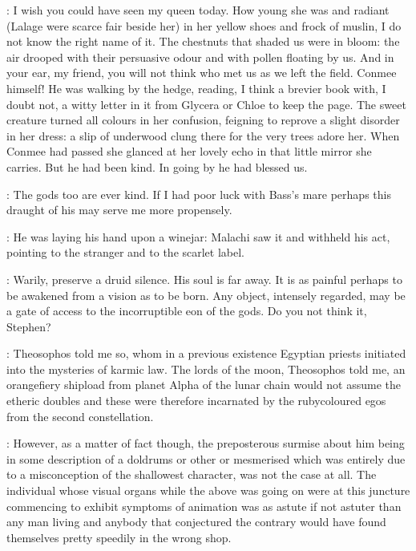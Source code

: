 \documentclass[12pt]{article}
\begin{document}
\Ly: I wish you could have seen my queen today.
How young she was and radiant (Lalage were scarce fair beside her)
in her yellow shoes and frock of muslin, I do not know the right name of
it. The chestnuts that shaded us were in bloom: the air drooped with
their persuasive odour and with pollen floating by us.
And in your ear, my friend,
you will not think who met us as we left the field.
Conmee himself! He was walking by the hedge, reading, I think a brevier
book with, I doubt not, a witty letter in it from Glycera or Chloe to
keep the page. The sweet creature turned all colours in her confusion,
feigning to reprove a slight disorder in her dress: a slip of underwood
clung there for the very trees adore her. When Conmee had passed she
glanced at her lovely echo in that little mirror she carries. But he had
been kind. In going by he had blessed us.

\Ln: The gods too are ever kind.
If I had poor luck with Bass's mare perhaps this draught of
his may serve me more propensely.

: He was laying his hand upon a winejar:
Malachi saw it and withheld his act, pointing to the stranger and to the
scarlet label.

\Mu:  Warily, preserve a druid silence.
His soul is far away. It is as painful perhaps to be awakened from a vision
as to be born. Any object, intensely regarded, may be a gate of access to
the incorruptible eon of the gods. Do you not think it, Stephen?

\SD: Theosophos told me so, whom in a previous existence
Egyptian priests initiated into the mysteries of karmic law. The lords of
the moon, Theosophos told me, an orangefiery shipload from planet Alpha
of the lunar chain would not assume the etheric doubles and these were
therefore incarnated by the rubycoloured egos from the second
constellation.



: However, as a matter of fact though, the preposterous surmise about him
being in some description of a doldrums or other or mesmerised which was
entirely due to a misconception of the shallowest character, was not the
case at all. The individual whose visual organs while the above was going
on were at this juncture commencing to exhibit symptoms of animation was
as astute if not astuter than any man living and anybody that conjectured
the contrary would have found themselves pretty speedily in the wrong shop.
\end{document}
